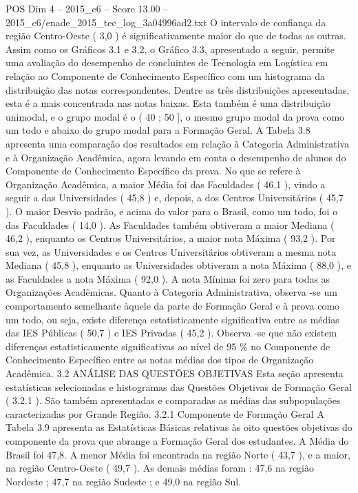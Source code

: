 \begin{textsample}{POS Dim 4 – 2015\_c6 – Score 13.00 – 2015\_c6/enade\_2015\_tec\_log\_3a04996ad2.txt}
O intervalo de confiança da região Centro-Oeste ( 3,0 ) é significativamente maior do que de todas as outras.
Assim como os Gráficos 3.1 e 3.2, o Gráfico 3.3, apresentado a seguir, permite uma avaliação do desempenho de concluintes de Tecnologia em Logística em relação ao Componente de Conhecimento Específico com um histograma da distribuição das notas correspondentes.
Dentre as três distribuições apresentadas, esta é a mais concentrada nas notas baixas.
Esta também é uma distribuição unimodal, e o grupo modal é o ( 40 ; 50 ], o mesmo grupo modal da prova como um todo e abaixo do grupo modal para a Formação Geral.
A Tabela 3.8 apresenta uma comparação dos resultados em relação à Categoria Administrativa e à Organização Acadêmica, agora levando em conta o desempenho de alunos do Componente de Conhecimento Específico da prova.
No que se refere à Organização Acadêmica, a maior Média foi das Faculdades ( 46,1 ), vindo a seguir a das Universidades ( 45,8 ) e, depois, a dos Centros Universitários ( 45,7 ).
O maior Desvio padrão, e acima do valor para o Brasil, como um todo, foi o das Faculdades ( 14,0 ).
As Faculdades também obtiveram a maior Mediana ( 46,2 ), enquanto os Centros Universitários, a maior nota Máxima ( 93,2 ).
Por sua vez, as Universidades e os Centros Universitários obtiveram a mesma nota Mediana ( 45,8 ), enquanto as Universidades obtiveram a nota Máxima ( 88,0 ), e as Faculdades a nota Máxima ( 92,0 ).
A nota Mínima foi zero para todas as Organizações Acadêmicas.
Quanto à Categoria Administrativa, observa -se um comportamento semelhante àquele da parte de Formação Geral e à prova como um todo, ou seja, existe diferença estatisticamente significativa entre as médias das IES Públicas ( 50,7 ) e IES Privadas ( 45,2 ).
Observa -se que não existem diferenças estatisticamente significativas ao nível de 95 \% no Componente de Conhecimento Específico entre as notas médias dos tipos de Organização Acadêmica. 3.2 ANÁLISE DAS QUESTÕES OBJETIVAS Esta seção apresenta estatísticas selecionadas e histogramas das Questões Objetivas de Formação Geral ( 3.2.1 ).
São também apresentadas e comparadas as médias das subpopulações caracterizadas por Grande Região. 3.2.1 Componente de Formação Geral A Tabela 3.9 apresenta as Estatísticas Básicas relativas às oito questões objetivas do componente da prova que abrange a Formação Geral dos estudantes.
A Média do Brasil foi 47,8.
A menor Média foi encontrada na região Norte ( 43,7 ), e a maior, na região Centro-Oeste ( 49,7 ).
As demais médias foram : 47,6 na região Nordeste ; 47,7 na região Sudeste ; e 49,0 na região Sul.

\end{textsample}
